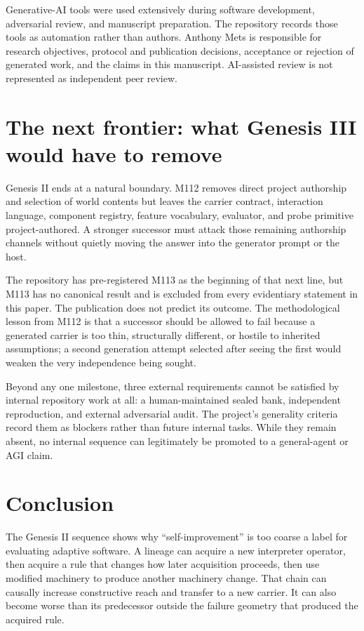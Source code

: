Generative-AI tools were used extensively during software development, adversarial review, and manuscript preparation. The repository records those tools as automation rather than authors. Anthony Mets is responsible for research objectives, protocol and publication decisions, acceptance or rejection of generated work, and the claims in this manuscript. AI-assisted review is not represented as independent peer review.

\section{The next frontier: what Genesis III would have to remove}
\label{sec:next}
Genesis II ends at a natural boundary. M112 removes direct project authorship and selection of world contents but leaves the carrier contract, interaction language, component registry, feature vocabulary, evaluator, and probe primitive project-authored. A stronger successor must attack those remaining authorship channels without quietly moving the answer into the generator prompt or the host.

The repository has pre-registered M113 as the beginning of that next line, but M113 has no canonical result and is excluded from every evidentiary statement in this paper. The publication does not predict its outcome. The methodological lesson from M112 is that a successor should be allowed to fail because a generated carrier is too thin, structurally different, or hostile to inherited assumptions; a second generation attempt selected after seeing the first would weaken the very independence being sought.

Beyond any one milestone, three external requirements cannot be satisfied by internal repository work at all: a human-maintained sealed bank, independent reproduction, and external adversarial audit. The project's generality criteria record them as blockers rather than future internal tasks. While they remain absent, no internal sequence can legitimately be promoted to a general-agent or AGI claim.

\section{Conclusion}
The Genesis II sequence shows why ``self-improvement'' is too coarse a label for evaluating adaptive software. A lineage can acquire a new interpreter operator, then acquire a rule that changes how later acquisition proceeds, then use modified machinery to produce another machinery change. That chain can causally increase constructive reach and transfer to a new carrier. It can also become worse than its predecessor outside the failure geometry that produced the acquired rule.

